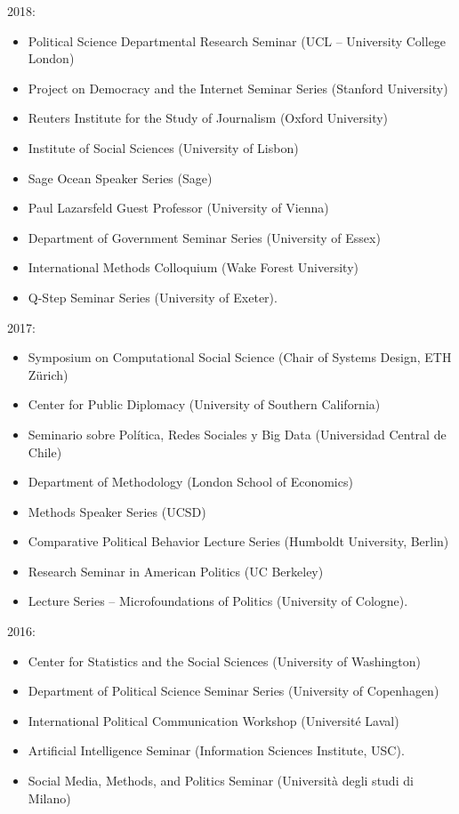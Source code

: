 \documentclass[margin,line,11pt]{resume}
\begin{document}
\begin{resume}
2018: 
\begin{itemize} 
\item Political Science Departmental Research Seminar (UCL -- University College London)
\item Project on Democracy and the Internet Seminar Series (Stanford University)
\item Reuters Institute for the Study of Journalism (Oxford University)
\item Institute of Social Sciences (University of Lisbon)
\item Sage Ocean Speaker Series (Sage)
\item Paul Lazarsfeld Guest Professor (University of Vienna)
\item Department of Government Seminar Series (University of Essex)
\item International Methods Colloquium (Wake Forest University)

\item Q-Step Seminar Series (University of Exeter).
\end{itemize}
2017:    
\begin{itemize}
\item Symposium on Computational Social Science (Chair of Systems Design, ETH Z\"{u}rich)
\item Center for Public Diplomacy (University of Southern California)
\item Seminario sobre Pol\'{i}tica, Redes Sociales y Big Data (Universidad Central de Chile)
\item Department of Methodology (London School of Economics)
\item Methods Speaker Series (UCSD)
\item Comparative Political Behavior Lecture Series (Humboldt University, Berlin)
\item Research Seminar in American Politics (UC Berkeley)
\item Lecture Series -- Microfoundations of Politics (University of Cologne).
\end{itemize}

2016:
\begin{itemize}
\item Center for Statistics and the Social Sciences (University of Washington)
\item Department of Political Science Seminar Series (University of Copenhagen)
\item International Political Communication Workshop (Universit\'{e} Laval)
\item Artificial Intelligence Seminar (Information Sciences Institute, USC).
\item Social Media, Methods, and Politics Seminar (Universit\`{a} degli studi di Milano)
\end{itemize}


\end{resume}
\end{document}
